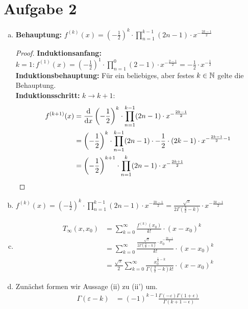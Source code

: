 \documentclass{article}
\begin{document}
    \section*{Aufgabe 2}
    \begin{enumerate}[(a)]
        \item \textbf{Behauptung:} \(f^{(k)}(x) = \left(-\frac{1}{2}\right)^k\cdot \prod_{n=1}^{k-1}(2n-1) \cdot x^{-\frac{2k-1}{2}}\)
        \begin{proof}
        \textbf{Induktionsanfang:} \(k = 1: f^{(1)}(x) = \left(-\frac{1}{2}\right)^1\cdot \prod_{n=1}^{0}(2-1) \cdot x^{-\frac{2-1}{2}} = -\frac{1}{2}\cdot x^{-\frac{1}{2}}\)\\
        \textbf{Induktionsbehauptung:} Für ein beliebiges, aber festes \(k\in \mathbb{N}\) gelte die Behauptung.\\
		\textbf{Induktionsschritt:} \(k \to k+1\): 
		\begin{align*}
            f^{(k+1)}(x) &= \frac{\mathrm{d}}{\mathrm{d} x}\left(-\frac{1}{2}\right)^k\cdot \prod_{n=1}^{k-1}(2n-1) \cdot x^{-\frac{2k-1}{2}}\\
            &= \left(-\frac{1}{2}\right)^k\cdot \prod_{n=1}^{k-1}(2n-1) \cdot -\frac{1}{2} \cdot (2k-1) \cdot x^{-\frac{2k-1}{2}-1}\\
            &= \left(-\frac{1}{2}\right)^{k+1}\cdot \prod_{n=1}^k(2n-1)\cdot x^{-\frac{2k+1}{2}}
        \end{align*}
        \end{proof}
        \item \(f^{(k)}(x) = \left(-\frac{1}{2}\right)^k\cdot \prod_{n=1}^{k-1}(2n-1) \cdot x^{-\frac{2k-1}{2}} = \frac{\sqrt{\pi}}{2\Gamma\left(\frac{3}{2}-k\right)}\cdot x^{-\frac{2k-1}{2}}\)
		\item 
		\begin{align*}
            T_\infty(x, x_0) &= \sum_{k = 0}^{\infty}\frac{f^{(k)}(x_0)}{k!}\cdot (x-x_0)^k\\
            &= \sum_{k = 0}^{\infty} \frac{\frac{\sqrt{\pi}}{2\Gamma\left(\frac{3}{2}-k\right)} \cdot x_0^{-\frac{2k-1}{2}}}{k!}\cdot (x-x_0)^k\\
            &= \frac{\sqrt{\pi}}{2}\sum_{k = 0}^{\infty}\frac{x_0^{\frac{1}{2}-k}}{\Gamma\left(\frac{3}{2}-k\right)k!}\cdot (x-x_0)^k
        \end{align*}
		\item Zunächst formen wir Aussage (ii) zu (ii') um.
		\begin{align*}
			\Gamma(\varepsilon - k) &= (-1)^{k-1}\frac{\Gamma(-\varepsilon)\Gamma(1 + \epsilon)}{\Gamma(k+1-\epsilon)}\\

\end{align*}
\end{enumerate}
\end{document}
